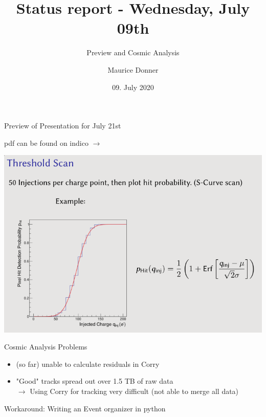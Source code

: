 \documentclass{beamer}
\title{\texorpdfstring{\color{blue!50!black}\textbf{Status report - Wednesday, July 09th}}{}}
\subtitle{Preview and Cosmic Analysis}
\author{Maurice Donner}
\date{09. July 2020}
\begin{document}
\maketitle

\begin{frame}{Preview of Presentation for July 21st}

    \begin{minipage}{.4\textwidth}
	pdf can be found on indico \( \rightarrow \) 
    \end{minipage}
    \begin{minipage}{.59\textwidth}
	\includegraphics[width=\textwidth]{Preview.png}
    \end{minipage}
\end{frame}

\begin{frame}{Cosmic Analysis}
    \LARGE Problems \normalsize \\
    \begin{itemize}
	\item (so far) unable to calculate residuals in Corry
	\item "Good" tracks spread out over 1.5 TB of raw data \\
	    \( \rightarrow \) Using Corry for tracking very difficult (not able
	    to merge all data)
    \end{itemize}
    \pause
    \LARGE Workaround: \normalsize 
    Writing an Event organizer in python\\[.5cm]
    \centering
\end{frame}
\end{document}
